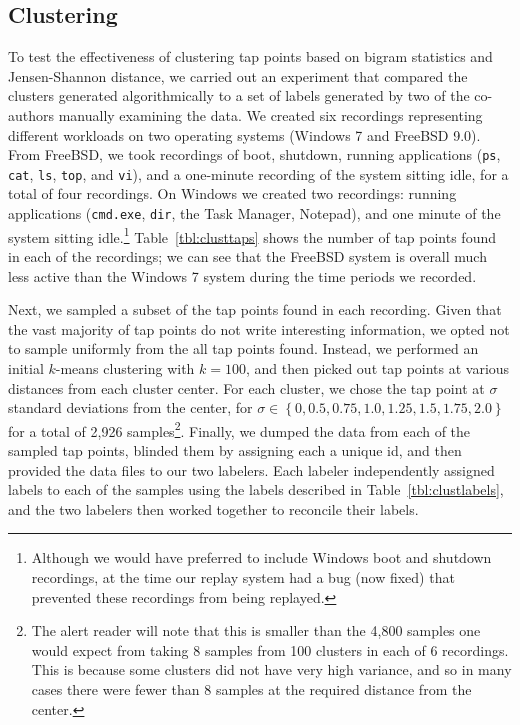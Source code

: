 \subsection{Clustering}
\label{sec:eval:subsec:cluster}

To test the effectiveness of clustering tap points based on bigram
statistics and Jensen-Shannon distance, we carried out an experiment
that compared the clusters generated algorithmically to a set of labels
generated by two of the co-authors manually examining the data. We
created six recordings representing different workloads on two operating
systems (Windows 7 and FreeBSD 9.0). From FreeBSD, we took recordings of
boot, shutdown, running applications (\texttt{ps}, \texttt{cat},
\texttt{ls}, \texttt{top}, and \texttt{vi}), and a one-minute recording
of the system sitting idle, for a total of four recordings. On Windows
we created two recordings: running applications (\texttt{cmd.exe},
\texttt{dir}, the Task Manager, Notepad), and one minute of the system
sitting idle.\footnote{Although we would have preferred to include
Windows boot and shutdown recordings, at the time our replay system had
a bug (now fixed) that prevented these recordings from being replayed.}
Table~\ref{tbl:clusttaps} shows the number of tap points found in each
of the recordings; we can see that the FreeBSD system is overall much
less active than the Windows 7 system during the time periods we
recorded.

Next, we sampled a subset of the tap points found in each recording.
Given that the vast majority of tap points do not write interesting
information, we opted not to sample uniformly from the all tap points
found. Instead, we performed an initial $k$-means clustering with $k =
100$, and then picked out tap points at various distances from each
cluster center. For each cluster, we chose the tap point at $\sigma$
standard deviations from the center, for $\sigma \in \left\{0, 0.5,
0.75, 1.0, 1.25, 1.5, 1.75, 2.0 \right\}$ for a total of 2,926
samples\footnote{The alert reader will note that this is smaller than
the 4,800 samples one would expect from taking 8 samples from 100
clusters in each of 6 recordings. This is because some clusters did not
have very high variance, and so in many cases there were fewer than 8
samples at the required distance from the center.}. Finally, we dumped
the data from each of the sampled tap points, blinded them by assigning
each a unique id, and then provided the data files to our two labelers.
Each labeler independently assigned labels to each of the samples using
the labels described in Table~\ref{tbl:clustlabels}, and the two
labelers then worked together to reconcile their labels.

